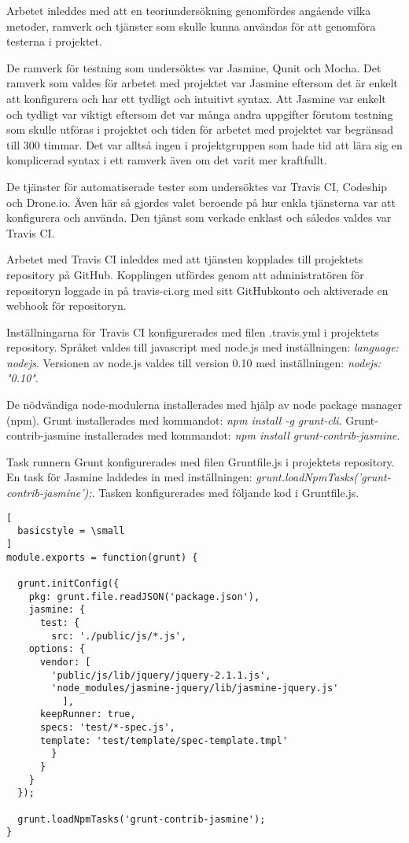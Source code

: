 Arbetet inleddes med att en teoriundersökning genomfördes
angående vilka metoder, ramverk och tjänster som skulle kunna
användas för att genomföra testerna i projektet.

De ramverk för
testning som undersöktes var Jasmine, Qunit och Mocha. Det
ramverk som valdes för arbetet med projektet var Jasmine
eftersom det är enkelt att konfigurera och har ett 
tydligt och intuitivt syntax. Att Jasmine var enkelt och tydligt
var viktigt eftersom det var många andra uppgifter förutom
testning som skulle utföras i projektet och tiden för
arbetet med projektet var begränsad till 300 timmar. Det var
alltså ingen i projektgruppen som hade tid att lära sig 
en komplicerad syntax i ett ramverk även om det varit
mer kraftfullt.

De tjänster för automatiserade tester som undersöktes var
Travis CI, Codeship och Drone.io. Även här 
så gjordes valet beroende på hur enkla tjänsterna var att
konfigurera och använda. Den tjänst som verkade enklast
och således valdes var Travis CI.

Arbetet med Travis CI inleddes med att tjänsten kopplades till 
projektets repository på GitHub. Kopplingen utfördes
genom att administratören för repositoryn loggade in på travis-ci.org med 
sitt GitHubkonto och aktiverade
en webhook för repositoryn.

Inställningarna för Travis CI konfigurerades med filen .travis.yml i projektets
repository. Språket valdes till
javascript med node.js med inställningen: \emph{language: node\textunderscore js}.
Versionen av node.js valdes till version 0.10
med inställningen: \emph{node\textunderscore js: "0.10"}.

De nödvändiga node-modulerna installerades med hjälp av node package manager (npm).
Grunt installerades
med kommandot: \emph{npm install -g grunt-cli}. Grunt-contrib-jasmine installerades med kommandot: 
\emph{npm install grunt-contrib-jasmine}.

Task runnern Grunt konfigurerades med filen Gruntfile.js i projektets repository.
En task för Jasmine laddedes in med
inställningen: \emph{grunt.loadNpmTasks('grunt-contrib-jasmine');}.
Tasken konfigurerades med följande kod i Gruntfile.js.

\begin{lstlisting}[
  basicstyle = \small
]
module.exports = function(grunt) {

  grunt.initConfig({
    pkg: grunt.file.readJSON('package.json'),
    jasmine: {
      test: {
        src: './public/js/*.js',
	options: {
	  vendor: [
	    'public/js/lib/jquery/jquery-2.1.1.js',
	    'node_modules/jasmine-jquery/lib/jasmine-jquery.js'
          ],
	  keepRunner: true,
	  specs: 'test/*-spec.js',
	  template: 'test/template/spec-template.tmpl'
        }
      }
    }
  });

  grunt.loadNpmTasks('grunt-contrib-jasmine');
}
\end{lstlisting}

